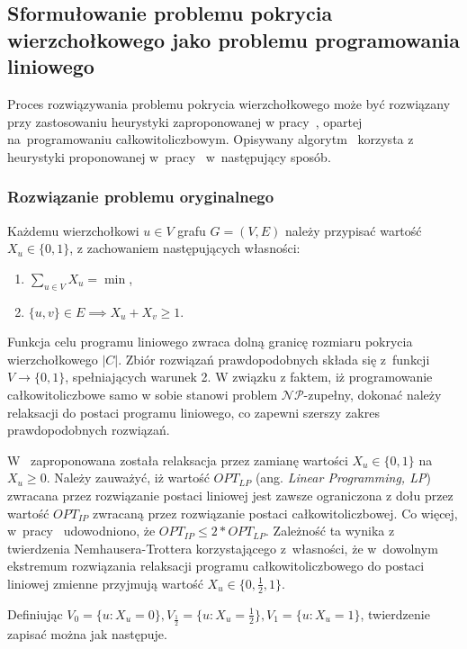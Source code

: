 \subsection{Sformułowanie problemu pokrycia wierzchołkowego jako problemu programowania liniowego}\label{section_kernelization_lp_formulation}

Proces rozwiązywania problemu pokrycia wierzchołkowego może być rozwiązany
przy zastosowaniu heurystyki zaproponowanej w pracy~\cite{hochbaum82}, opartej 
na~programowaniu całkowitoliczbowym.
Opisywany algorytm~\cite[rozdz.~4.2.2]{abukhzam03} korzysta z~ heurystyki proponowanej w~pracy~\cite{hochbaum82} 
w~następujący sposób.

\subsubsection{\textbf{Rozwiązanie problemu oryginalnego}}\label{ss_lp_original}
Każdemu wierzchołkowi $u \in V$ grafu $G=(V,E)$ należy przypisać wartość $X_u
\in \{0, 1\}$, z zachowaniem następujących własności:
\begin{enumerate}
  \item $\sum_{u \in V}X_u = \min$,
  \item $\{u,v\} \in E \implies X_u + X_v \geq 1$.
\end{enumerate}

Funkcja celu programu liniowego zwraca dolną granicę rozmiaru pokrycia wierzchołkowego $|C|$.
Zbiór rozwiązań prawdopodobnych składa się z~funkcji $V \to \{0, 1\}$,
spełniających warunek 2.
W związku z faktem, iż programowanie całkowitoliczbowe samo w sobie stanowi
problem $\mathcal{NP}$-zupełny, dokonać należy relaksacji do postaci programu liniowego, co
zapewni szerszy zakres prawdopodobnych rozwiązań.

W~\cite{khuller02} zaproponowana została relaksacja przez zamianę wartości 
$X_u \in \{0,1\}$ na $X_u \geq 0$.
Należy zauważyć, iż wartość $OPT_{LP}$ (ang. \emph{Linear Programming, LP}) zwracana przez rozwiązanie postaci 
liniowej jest zawsze ograniczona z dołu przez wartość $OPT_{IP}$ zwracaną przez 
rozwiązanie postaci całkowitoliczbowej.
Co więcej, w~pracy~\cite{khuller02} udowodniono, że $OPT_{IP} \leq 2*OPT_{LP}$.
Zależność ta wynika z twierdzenia Nemhausera-Trottera korzystającego
z~własności, że w~dowolnym ekstremum rozwiązania relaksacji programu
całkowitoliczbowego do postaci liniowej zmienne przyjmują wartość 
$X_u \in \{0, \frac{1}{2}, 1\}$.

Definiując $V_0 = \{u : X_u=0\}, V_{\frac{1}{2}}=\{u: X_u=\frac{1}{2}\},
V_1=\{u: X_u=1\}$, twierdzenie zapisać można jak następuje.

